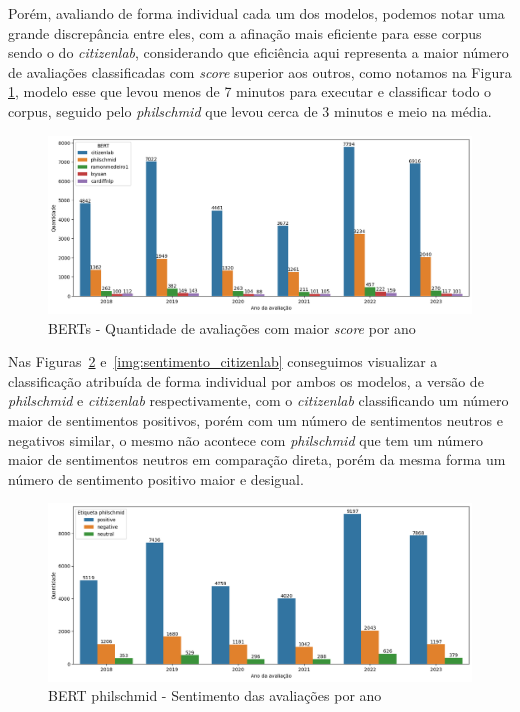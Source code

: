 Porém, avaliando de forma individual cada um dos modelos, podemos notar uma grande discrepância entre eles, com a afinação mais eficiente para esse corpus sendo o do \textit{citizenlab}, considerando que eficiência aqui representa a maior número de avaliações classificadas com \textit{score} superior aos outros, como notamos na Figura \ref{img:rinha_de_berts}, modelo esse que levou menos de 7 minutos para executar e classificar todo o corpus, seguido pelo \textit{philschmid} que levou cerca de 3 minutos e meio na média.

\begin{figure}
	\centering
	\includegraphics[width=1\textwidth]{figs/bert/desempenho_berts.png}
	\caption{BERTs - Quantidade de avaliações com maior \textit{score} por ano}
	\label{img:rinha_de_berts}
\end{figure}

Nas Figuras~\ref{img:sentimento_phil} e~\ref{img:sentimento_citizenlab} conseguimos visualizar a classificação atribuída de forma individual por ambos os modelos, a versão de \textit{philschmid} e \textit{citizenlab} respectivamente, com o \textit{citizenlab} classificando um número maior de sentimentos positivos, porém com um número de sentimentos neutros e negativos similar, o mesmo não acontece com \textit{philschmid} que tem um número maior de sentimentos neutros em comparação direta, porém da mesma forma um número de sentimento positivo maior e desigual.

\begin{figure}
	\centering
	\centering
	\includegraphics[width=1\textwidth]{figs/bert/classificacao_phil.png}
	\caption{BERT philschmid - Sentimento das avaliações por ano}
	\label{img:sentimento_phil}
\end{figure}

